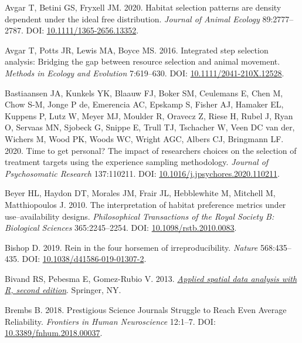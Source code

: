 \documentclass[10pt,a4paper]{article}
\newlength{\cslhangindent}
\newenvironment{CSLReferences}[2] %
 {\begin{list}{}{%
  \setlength{\itemindent}{0pt}
  \setlength{\leftmargin}{0pt}
  \setlength{\parsep}{0pt}
  \ifodd #1
   \setlength{\leftmargin}{\cslhangindent}
   \setlength{\itemindent}{-1\cslhangindent}
  \fi
  \setlength{\itemsep}{#2\baselineskip}}}
 {\end{list}}
\begin{document}
\begin{CSLReferences}{1}{0}
Avgar T, Betini GS, Fryxell JM. 2020. Habitat selection patterns are density dependent under the ideal free distribution. \emph{Journal of Animal Ecology} 89:2777--2787. DOI: \href{https://doi.org/10.1111/1365-2656.13352}{10.1111/1365-2656.13352}.

Avgar T, Potts JR, Lewis MA, Boyce MS. 2016. Integrated step selection analysis: Bridging the gap between resource selection and animal movement. \emph{Methods in Ecology and Evolution} 7:619--630. DOI: \href{https://doi.org/10.1111/2041-210X.12528}{10.1111/2041-210X.12528}.

Bastiaansen JA, Kunkels YK, Blaauw FJ, Boker SM, Ceulemans E, Chen M, Chow S-M, Jonge P de, Emerencia AC, Epskamp S, Fisher AJ, Hamaker EL, Kuppens P, Lutz W, Meyer MJ, Moulder R, Oravecz Z, Riese H, Rubel J, Ryan O, Servaas MN, Sjobeck G, Snippe E, Trull TJ, Tschacher W, Veen DC van der, Wichers M, Wood PK, Woods WC, Wright AGC, Albers CJ, Bringmann LF. 2020. Time to get personal? {The} impact of researchers choices on the selection of treatment targets using the experience sampling methodology. \emph{Journal of Psychosomatic Research} 137:110211. DOI: \href{https://doi.org/10.1016/j.jpsychores.2020.110211}{10.1016/j.jpsychores.2020.110211}.

Beyer HL, Haydon DT, Morales JM, Frair JL, Hebblewhite M, Mitchell M, Matthiopoulos J. 2010. The interpretation of habitat preference metrics under use--availability designs. \emph{Philosophical Transactions of the Royal Society B: Biological Sciences} 365:2245--2254. DOI: \href{https://doi.org/10.1098/rstb.2010.0083}{10.1098/rstb.2010.0083}.

Bishop D. 2019. Rein in the four horsemen of irreproducibility. \emph{Nature} 568:435--435. DOI: \href{https://doi.org/10.1038/d41586-019-01307-2}{10.1038/d41586-019-01307-2}.

Bivand RS, Pebesma E, Gomez-Rubio V. 2013. \emph{\href{https://asdar-book.org/}{Applied spatial data analysis with {R}, second edition}}. Springer, NY.

Brembs B. 2018. Prestigious {Science} {Journals} {Struggle} to {Reach} {Even} {Average} {Reliability}. \emph{Frontiers in Human Neuroscience} 12:1--7. DOI: \href{https://doi.org/10.3389/fnhum.2018.00037}{10.3389/fnhum.2018.00037}.


\end{CSLReferences}
\end{document}
